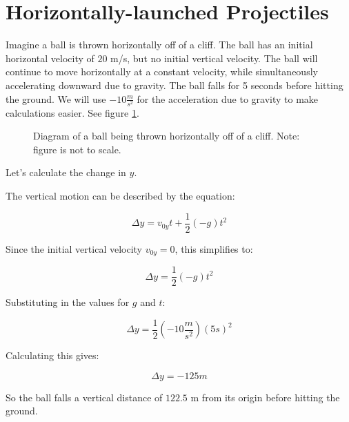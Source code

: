 \section{Horizontally-launched Projectiles}
Imagine a ball is thrown horizontally off of a cliff. The ball has an initial horizontal velocity of $20$ m/s, but no initial vertical velocity. The ball will continue to move horizontally at a constant velocity, while simultaneously accelerating downward due to gravity. The ball falls for 5 seconds before hitting the ground. We will use $-10 \frac{m}{s^2}$ for the acceleration due to gravity to make calculations easier. See figure \ref{fig:horiz_launch}.
\begin{figure}[htbp]
    \centering
    \caption{Diagram of a ball being thrown horizontally off of a cliff. Note: figure is not to scale.}
    \label{fig:horiz_launch}
\end{figure}

Let's calculate the change in $y$. 

The vertical motion can be described by the equation:

\[
\Delta y = v_{0y} t + \frac{1}{2} (-g) t^2
\]

Since the initial vertical velocity $v_{0y} = 0$, this simplifies to:

\[
\Delta y = \frac{1}{2} (-g) t^2
\]

Substituting in the values for $g$ and $t$:

\[
\Delta y = \frac{1}{2} (-10 \frac{m}{s^2}) (5 s)^2
\]

Calculating this gives:

\[
\Delta y = -125 m
\]

So the ball falls a vertical distance of $122.5$ m from its origin before hitting the ground.

